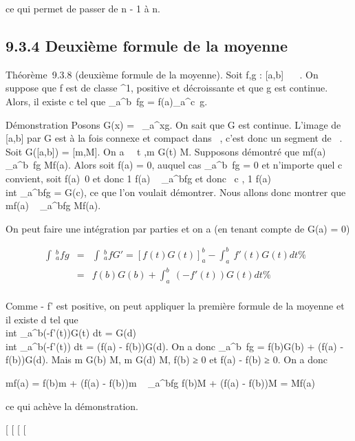 \documentclass[]{article}
\begin{document}
ce qui permet de passer de n - 1 à n.

\subsection{9.3.4 Deuxième formule de la moyenne}

Théorème~9.3.8 (deuxième formule de la moyenne). Soit f,g : [a,b] \rightarrow~
~. On suppose que f est de classe ^1, positive et
décroissante et que g est continue. Alors, il existe c \in [a,b] tel
que \int  _a^b~fg =
f(a)\int  _a^c~g.

Démonstration Posons G(x) =\int ~
_a^xg. On sait que G est continue. L'image de [a,b]
par G est à la fois connexe et compact dans ~, c'est donc un segment de
~. Soit G([a,b]) = [m,M]. On a \forall~~t \in
[a,b],m \leq G(t) \leq M. Supposons démontré que mf(a)
\leq\int  _a^b~fg \leq Mf(a). Alors soit
f(a) = 0, auquel cas \int  _a^b~fg
= 0 et n'importe quel c convient, soit f(a)\neq~0
et donc  1 \over f(a) \int ~
_a^bfg \in [m,M] et donc \exists~c \in
[a,b], 1 \over f(a) \\int
 _a^bfg = G(c), ce que l'on voulait démontrer. Nous
allons donc montrer que mf(a) \leq\int ~
_a^bfg \leq Mf(a).

On peut faire une intégration par parties et on a (en tenant compte de
G(a) = 0)

\begin{align*} \int ~
_a^bfg& =& \int ~
_a^bfG' = \left
[f(t)G(t)\right ]_ a^b
-\int  _a^b~f'(t)G(t) dt\%&
\\ & =& f(b)G(b)
+\int  _a^b~(-f'(t))G(t) dt \%&
\\ \end{align*}

Comme - f' est positive, on peut appliquer la première formule de la
moyenne et il existe d \in [a,b] tel que \\int
 _a^b(-f'(t))G(t) dt = G(d)\\int
 _a^b(-f'(t)) dt = (f(a) - f(b))G(d). On a donc
\int  _a^b~fg = f(b)G(b) + (f(a) -
f(b))G(d). Mais m \leq G(b) \leq M, m \leq G(d) \leq M, f(b) ≥ 0 et f(a) - f(b) ≥ 0.
On a donc

mf(a) = f(b)m + (f(a) - f(b))m \leq\int ~
_a^bfg \leq f(b)M + (f(a) - f(b))M = Mf(a)

ce qui achève la démonstration.

[
[
[
[
\end{document}
